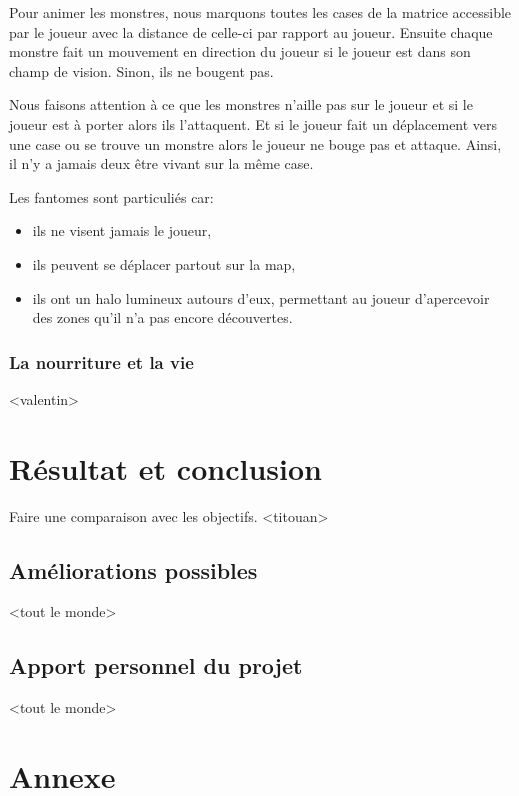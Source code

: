 \documentclass[11pt]{report}
\begin{document}
		Pour animer les monstres, nous marquons toutes les cases de la matrice accessible par le joueur avec la distance de celle-ci par rapport au joueur. Ensuite chaque monstre fait un mouvement en direction du joueur si le joueur est dans son champ de vision. Sinon, ils ne bougent pas.
		
		Nous faisons attention à ce que les monstres n'aille pas sur le joueur et si le joueur est à porter alors ils l'attaquent. Et si le joueur fait un déplacement vers une case ou se trouve un monstre alors le joueur ne bouge pas et attaque. Ainsi, il n'y a jamais deux être vivant sur la même case.
		
		Les fantomes sont particuliés car:
		\begin{itemize}
			\item ils ne visent jamais le joueur,
			\item ils peuvent se déplacer partout sur la map,
			\item ils ont un halo lumineux autours d'eux, permettant au joueur d'apercevoir des zones qu'il n'a pas encore découvertes.
		\end{itemize}
		
		\subsection{La nourriture et la vie}
		
		<valentin>

\chapter{Résultat et conclusion}

	Faire une comparaison avec les objectifs. <titouan>
	
	\section{Améliorations possibles}
	
	<tout le monde>
	
	\section{Apport personnel du projet}
	
	<tout le monde>

\chapter{Annexe}
\end{document}
